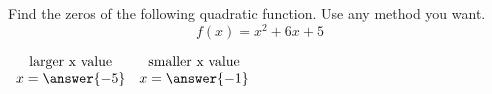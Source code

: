 \documentclass{ximera}
\author{David Kish}
\begin{document}
\begin{exercise}
Find the zeros of the following quadratic function. Use any method you want. 
\[
f(x) = x^2+6x + 5
\]

\begin{center}
$
\begin{array}{cc}
\text{larger x value} & \text{smaller x value}\\
x  = \answer{-5} & x = \answer{-1}
\end{array}
$
\end{center}
\end{exercise}
\end{document}
